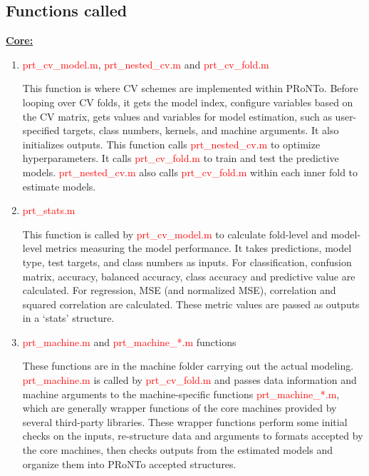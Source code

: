 
\subsection{Functions called}

\textbf{\underline{Core:}}

\begin{enumerate}

\item \textcolor{red}{prt\_cv\_model.m}, \textcolor{red}{prt\_nested\_cv.m} and \textcolor{red}{prt\_cv\_fold.m}

This function is where CV schemes are implemented within PRoNTo. Before looping over CV folds, it gets the model index, configure variables based on the CV matrix, gets values and variables for model estimation, such as user-specified targets, class numbers, kernels, and machine arguments. It also initializes outputs. This function calls \textcolor{red}{prt\_nested\_cv.m} to optimize hyperparameters. It calls \textcolor{red}{prt\_cv\_fold.m} to train and test the predictive models. \textcolor{red}{prt\_nested\_cv.m} also calls \textcolor{red}{prt\_cv\_fold.m} within each inner fold to estimate models. 
       
\item \textcolor{red}{prt\_stats.m}

This function is called by \textcolor{red}{prt\_cv\_model.m} to calculate fold-level and model-level metrics measuring the model performance. It takes predictions, model type, test targets, and class numbers as inputs.  For classification, confusion matrix, accuracy, balanced accuracy, class accuracy and predictive value are calculated.  For regression, MSE (and normalized MSE), correlation and squared correlation are calculated. These metric values are passed as outputs in a `stats' structure.
       
\item \textcolor{red}{prt\_machine.m} and \textcolor{red}{prt\_machine\_*.m} functions

These functions are in the machine folder carrying out the actual modeling. \textcolor{red}{prt\_machine.m} is called by \textcolor{red}{prt\_cv\_fold.m} and passes data information and machine arguments to the machine-specific functions \textcolor{red}{prt\_machine\_*.m}, which are generally wrapper functions of the core machines provided by several third-party libraries. These wrapper functions perform some initial checks on the inputs, re-structure data and arguments to formats accepted by the core machines, then checks outputs from the estimated models and organize them into PRoNTo accepted structures. 

\end{enumerate}


